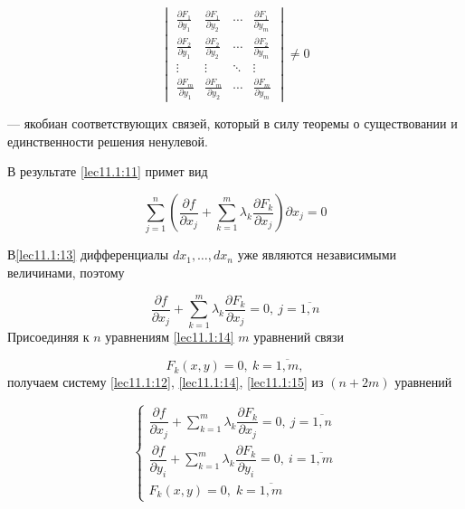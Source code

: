\documentclass[../../main.tex]{subfiles}
\begin{document}
	\[
	\begin{vmatrix}
	\frac{\partial F_1}{\partial y_1} & \frac{\partial F_1}{\partial y_2}
	& \cdots & \frac{\partial F_1}{\partial y_m} \\
	\frac{\partial F_2}{\partial y_1} & \frac{\partial F_2}{\partial y_2} 
	& \cdots & \frac{\partial F_2}{\partial y_m} \\
	\vdots  & \vdots  & \ddots & \vdots  \\
	\frac{\partial F_m}{\partial y_1} & \frac{\partial F_m}{\partial y_2}
	& \cdots & \frac{\partial F_m}{\partial y_m}
	\end{vmatrix} \ne 0
	\]
	
    --- якобиан соответствующих связей, который в силу теоремы о существовании
	и единственности решения ненулевой.
	
	В результате \eqref{lec11.1:11} примет вид
	
	\begin{equation}
	\label{lec11.1:13}
	\sum\limits_{j=1}^{n}\left(  \dfrac{\partial f }{\partial x_j} + 
	\sum\limits_{k=1}^{m} \lambda_k\dfrac{\partial F_k }{\partial x_j}  
	\right) \partial x_j =0 
	\end{equation}
	
	В\eqref{lec11.1:13} дифференциалы
	$d x_1,\ldots,d x_n$ уже являются независимыми величинами, поэтому
	
	\begin{equation}
	\label{lec11.1:14}
	\dfrac{\partial f }{\partial x_j} + \sum\limits_{k=1}^{m}
	\lambda_k \dfrac{\partial F_k }{\partial x_j} = 0,\ j = \overline{1, n}
	\end{equation}
	Присоединяя к $n$ уравнениям \eqref{lec11.1:14} $m$
	уравнений связи
	
	\begin{equation}
	 \label{lec11.1:15}
	 F_k(x, y) = 0,\ k = \overline{1, m},
	\end{equation}
	получаем систему
	\eqref{lec11.1:12},
	\eqref{lec11.1:14},
	\eqref{lec11.1:15}
	из $ \left( n + 2m \right) $ уравнений
	
	\[
	\begin{cases}
	\dfrac{\partial f }{\partial x_j} + \sum\limits_{k=1}^{m}
	\lambda_k \dfrac{\partial F_k }{\partial x_j} = 0,\ j = \overline{1, n}\\
	\dfrac{\partial f}{\partial y_i} + \sum\limits_{k = 1}^m \lambda_k 
	\dfrac{\partial F_k}{\partial y_i} = 0,\ i = \overline{1,m} \\
	F_k\left( x, y \right) = 0,\; k = \overline{1, m}
	\end{cases}
	\]
	
\end{document}
